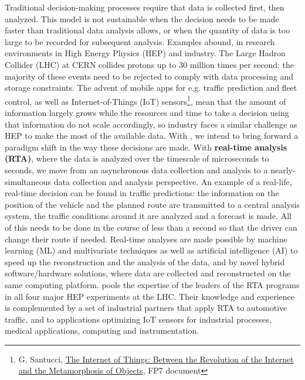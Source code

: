 Traditional decision-making processes require that data is collected first, 
then analyzed. This model is not sustainable when the decision needs to be made faster than traditional data analysis allows, or when the quantity of data is too large to be recorded for subsequent analysis. 
Examples abound, in research environments in High Energy Physics (HEP) and industry. 
The Large Hadron Collider (LHC) at CERN collides protons up to 30 million times per second: 
the majority of these events need to be rejected to comply
with data processing and storage constraints. 
The advent of mobile apps for e.g. traffic prediction and fleet control, as well as
Internet-of-Things (IoT) sensors\footnote{G. Santucci, \href{http://cordis.europa.eu/fp7/ict/enet/documents/publications/iot-between-the-internet-revolution.pdf}{The Internet of Things: Between the Revolution of the Internet and the Metamorphosis of Objects}, FP7 document},
mean that the amount of information 
largely grows while the resources and time to take a decision using 
that information do not scale accordingly, so industry faces a similar challenge as HEP
to make the most of the available data. 
\vskip2pt
With \acronym, we intend to bring forward a paradigm shift in the way these
decisions are made. With \textbf{real-time analysis (RTA)}, where the data is analyzed 
over the timescale of microseconds to seconds, 
we move from an asynchronous
data collection and analysis to a nearly-simultaneous data collection and analysis
perspective. An example of a real-life, real-time decision can be found in
traffic predictions: the information on the position of the vehicle and the planned route are 
transmitted to a central analysis system, the traffic conditions around it are analyzed and a forecast is made. 
All of this needs to be done in the course of less than a second so that the driver can change their route if needed. 
Real-time analyses are made possible by machine learning (ML) and multivariate techniques as well as artificial intelligence (AI)
to speed up the reconstruction and the analysis of the data, and by 
novel hybrid software/hardware solutions,
where data are collected and reconstructed on the same computing platform. 
\vskip2pt
\acronym pools the expertise of the leaders of the RTA programs in 
all four major HEP experiments at the LHC. 
Their knowledge and experience is complemented by a set of industrial partners that apply RTA
to automotive traffic, and to applications optimizing IoT sensors for industrial processes, 
medical applications, computing and instrumentation. 

